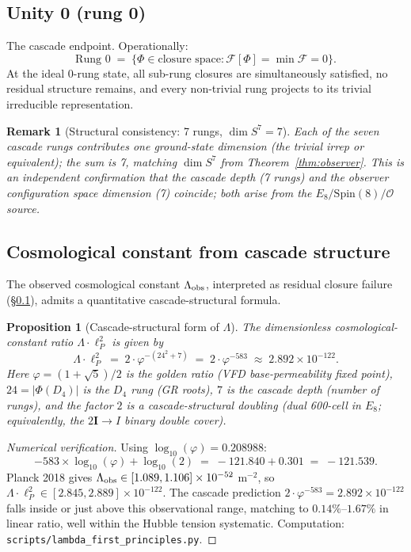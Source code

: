 \documentclass[12pt]{article}
\newtheorem{proposition}[theorem]{Proposition}
\newtheorem{remark}[theorem]{Remark}
\newcommand{\Fcal}{\mathcal{F}}
\newcommand{\twoI}{2\mathbf{I}}
\begin{document}
\subsection{Unity 0 (rung 0)}\label{sec:lower:unity}

The cascade endpoint. Operationally:
\[
\text{Rung 0} \;=\; \{\Phi \in \text{closure space} : \Fcal[\Phi] = \min \Fcal = 0\}.
\]
At the ideal 0-rung state, all sub-rung closures are simultaneously satisfied, no residual structure remains, and every non-trivial rung projects to its trivial irreducible representation.

\begin{remark}[Structural consistency: 7 rungs, $\dim S^7 = 7$]
Each of the seven cascade rungs contributes one ground-state dimension (the trivial irrep or equivalent); the sum is 7, matching $\dim S^7$ from Theorem~\ref{thm:observer}. This is an independent confirmation that the cascade depth (7 rungs) and the observer configuration space dimension (7) coincide; both arise from the $E_8 / \mathrm{Spin}(8) / \mathcal{O}$ source.
\end{remark}

\subsection{Cosmological constant from cascade structure}\label{sec:lower:lambda}

The observed cosmological constant $\Lambda_{\rm obs}$, interpreted as residual closure failure (§\ref{sec:lower:unity}), admits a quantitative cascade-structural formula.

\begin{proposition}[Cascade-structural form of $\Lambda$]\label{prop:lambda}
The dimensionless cosmological-constant ratio $\Lambda \cdot \ell_P^2$ is given by
\begin{equation}\label{eq:lambda}
    \Lambda \cdot \ell_P^2 \;=\; 2 \cdot \varphi^{-(24^2 + 7)} \;=\; 2 \cdot \varphi^{-583} \;\approx\; 2.892 \times 10^{-122}.
\end{equation}
Here $\varphi = (1+\sqrt{5})/2$ is the golden ratio (VFD base-permeability fixed point), $24 = |\Phi(D_4)|$ is the $D_4$ rung (GR roots), $7$ is the cascade depth (number of rungs), and the factor $2$ is a cascade-structural doubling (dual 600-cell in $E_8$; equivalently, the $\twoI \to I$ binary double cover).
\end{proposition}

\begin{proof}[Numerical verification]
Using $\log_{10}(\varphi) = 0.208988$:
\[
    -583 \times \log_{10}(\varphi) + \log_{10}(2) \;=\; -121.840 + 0.301 \;=\; -121.539.
\]
Planck 2018 gives $\Lambda_{\rm obs} \in [1.089, 1.106] \times 10^{-52}$ m$^{-2}$, so $\Lambda \cdot \ell_P^2 \in [2.845, 2.889] \times 10^{-122}$. The cascade prediction $2 \cdot \varphi^{-583} = 2.892 \times 10^{-122}$ falls inside or just above this observational range, matching to $0.14\%$--$1.67\%$ in linear ratio, well within the Hubble tension systematic. Computation: \texttt{scripts/lambda\_first\_principles.py}.
\end{proof}
\end{document}
